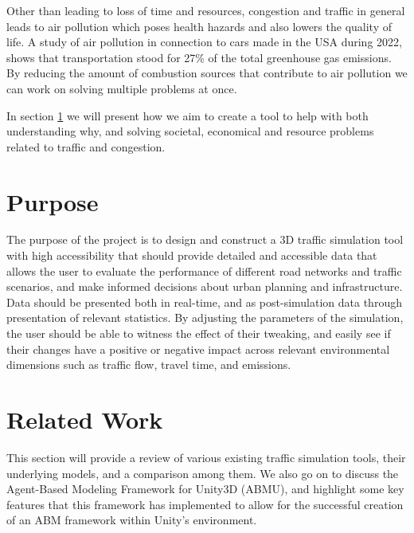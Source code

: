     Other than leading to loss of time and resources, congestion and traffic in general leads to air pollution which poses health hazards and also lowers the quality of life\cite{urban_2004}. A study of air pollution in connection to cars made in the USA during 2022, shows that transportation stood for 27\% of the total greenhouse gas emissions\cite{treehugger_2022}. By reducing the amount of combustion sources that contribute to air pollution we can work on solving multiple problems at once.

    In section \ref{purpose} we will present how we aim to create a tool to help with both understanding why, and solving societal, economical and resource problems related to traffic and congestion.

\section{Purpose}\label{purpose}
    The purpose of the project is to design and construct a 3D traffic simulation tool with high accessibility that should provide detailed and accessible data that allows the user to evaluate the performance of different road networks and traffic scenarios, and make informed decisions about urban planning and infrastructure. Data should be presented both in real-time, and as post-simulation data through presentation of relevant statistics. By adjusting the parameters of the simulation, the user should be able to witness the effect of their tweaking, and easily see if their changes have a positive or negative impact across relevant environmental dimensions such as traffic flow, travel time, and emissions. 

\section{Related Work} \label{Section_ref}
    This section will provide a review of various existing traffic simulation tools, their underlying models, and a comparison among them. We also go on to discuss the Agent-Based Modeling Framework for Unity3D (ABMU), and highlight some key features that this framework has implemented to allow for the successful creation of an ABM framework within Unity's environment.


